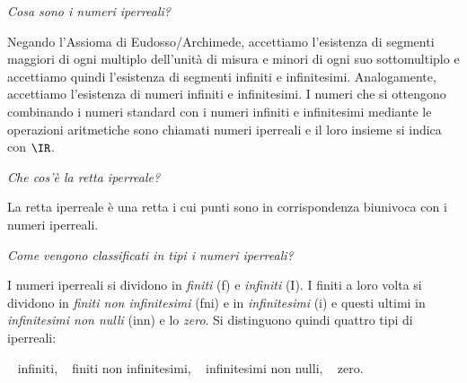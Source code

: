 \begin{esercizio}\label{ese:iper_013} 
\emph{Cosa sono i numeri iperreali?}

Negando l'Assioma di Eudosso/Archimede, accettiamo l'esistenza di segmenti 
maggiori di ogni multiplo dell'unità di misura e minori di ogni suo 
sottomultiplo e accettiamo quindi l'esistenza di segmenti infiniti e 
infinitesimi. Analogamente, accettiamo l'esistenza di numeri infiniti e 
infinitesimi. I numeri che si ottengono combinando i numeri standard con i 
numeri infiniti e infinitesimi mediante le operazioni aritmetiche sono 
chiamati numeri iperreali e il loro insieme si indica con \(\IR\).
\end{esercizio}

\begin{esercizio}\label{ese:iper_014} 
\emph{Che cos'è la retta iperreale?}

La retta iperreale è una retta i cui punti sono in corrispondenza biunivoca 
con i numeri iperreali.
\end{esercizio}

\begin{esercizio}\label{ese:iper_015} 
\emph{Come vengono classificati in tipi i numeri iperreali?}

I numeri iperreali si dividono in \emph{finiti} (f) e \emph{infiniti} (I). 
I finiti a loro volta si dividono in \emph{finiti non infinitesimi} (fni) e 
in \emph{infinitesimi} (i) e questi ultimi in \emph{infinitesimi non nulli} 
(inn) e lo \emph{zero}. 
Si distinguono quindi quattro tipi di iperreali: 
\begin{center}
\textbullet ~ infiniti, \qquad 
\textbullet ~ finiti non infinitesimi, \qquad 
\textbullet ~ infinitesimi non nulli, \qquad 
\textbullet ~ zero.
\end{center}
\end{esercizio}

